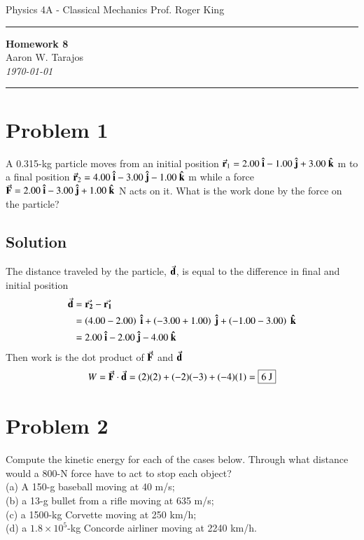 \documentclass{article}
\begin{document}
\noindent
Physics 4A - Classical Mechanics \hfill Prof. Roger King

\noindent\rule{\textwidth}{0.4pt}

\begin{center}
    \textbf{\LARGE Homework 8} \\
    \vspace{12pt}
    \large Aaron W. Tarajos \\
    \textit{\today}
\end{center}

\noindent\rule{\textwidth}{0.4pt}

\section*{Problem 1}
A 0.315-kg particle moves from an initial position $\va{r}_1 = 2.00\ \vu{i} - 1.00\ \vu{j} + 3.00\ \vu{k}$ m to a final position $\va{r}_2 = 4.00\ \vu{i} - 3.00\ \vu{j} - 1.00\ \vu{k}$ m while a force $\va{F} = 2.00\ \vu{i} - 3.00\ \vu{j} + 1.00\ \vu{k}$ N acts on it. What is the work done by the force on the particle?

\subsection*{Solution}
The distance traveled by the particle, $\va{d}$, is equal to the difference in final and initial position
\begin{align*}
	\va{d} &= \va{r_2} - \va{r_1} \\
	       &= \left( 4.00 - 2.00 \right)\ \vu{i} + \left( -3.00 + 1.00 \right)\ \vu{j} + \left( -1.00 -3.00 \right)\ \vu{k} \\
	       &= 2.00\ \vu{i} - 2.00\ \vu{j} - 4.00\ \vu{k}
\end{align*}
Then work is the dot product of $\va{F}$ and $\va{d}$
\[
	W = \va{F} \cdot \va{d} = (2)(2) + (-2)(-3) + (-4)(1) = \boxed{6\ \text{J}}
\]

\section*{Problem 2}
Compute the kinetic energy for each of the cases below. Through what distance would a 800-N force have
to act to stop each object? \\
(a) A 150-g baseball moving at 40 m/s; \\
(b) a 13-g bullet from a rifle moving at 635 m/s; \\
(c) a 1500-kg Corvette moving at 250 km/h; \\
(d) a $1.8 \times 10^5$-kg Concorde airliner moving at 2240
km/h.
\end{document}

